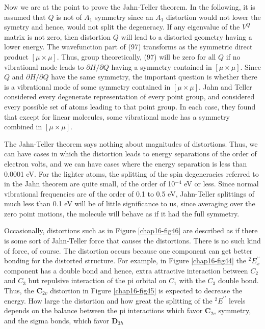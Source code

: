 Now we are at the point to prove the Jahn-Teller theorem.   In the 
following, it is assumed that $Q$ is not of $A_1$ symmetry since an 
$A_1$ distortion would not lower the symetry and hence, would not 
split the degeneracy.   If any eigenvalue of the $V^Q$ matrix is not 
zero, then distortion $Q$ will lead to a distorted geometry having a 
lower energy.  The wavefunction part of (97) transforms as the 
symmetric direct product $[ \mu \times \mu]$.  Thus, group 
theoretically, (97) will be zero for all $Q$ if no vibrational mode 
leads to $\partial H / \partial Q$ having a symmetry contained in 
$[ \mu \times \mu]$.  Since $Q$ and $\partial H / \partial Q$ have 
the same symmetry, the important question is whether there is a 
vibrational mode of some symmetry contained in $[ \mu \times \mu]$.  
Jahn and Teller considered every degenerate representation of every 
point group, and considered every possible set of atoms leading to 
that point group.  In each case, they found that except for linear 
molecules, some vibrational mode has a symmetry combined in 
$[ \mu \times \mu]$.

The Jahn-Teller theorem says nothing about magnitudes of distortions.  
Thus, we can have cases in which the distortion leads to energy 
separations of the order of electron volts, and we can have cases 
where the energy separation is less than 0.0001 eV.  For the lighter 
atoms, the splitting of the spin degeneracies referred to in the Jahn 
theorem are quite small, of the order of 10$^{-4}$ eV or less.  Since 
normal vibrational frequencies are of the order of 0.1 to 0.5 eV, 
Jahn-Teller splittings of much less than 0.1 eV will be of little 
significance to us, since averaging over the zero point motions, the 
molecule will behave as if it had the full symmetry.

Occasionally, distortions such as in Figure \ref{chap16-fig46} are
described as if there is some sort of Jahn-Teller force that causes
the distortions.  There is no such kind of force, of course.  The
distortion occurs because one component can get better bonding for the
distorted structure.  For example, in Figure \ref{chap16-fig44} the
$^2E_x^{\prime\prime}$ component has a double bond and hence, extra
attractive interaction between $C_2$ and $C_3$ but repulsive
interaction of the pi orbital on $C_1$ with the $C_3$ double bond.
Thus, the {\bf C}$_{2v}$ distortion in Figure \ref{chap16-fig45} is
expected to decrease the energy.  How large the distortion and how
great the splitting of the $^2E^{\prime\prime}$ levels depends on the
balance between the pi interactions which favor {\bf C}$_{2v}$
symmetry, and the sigma bonds, which favor {\bf D}$_{3h}$

